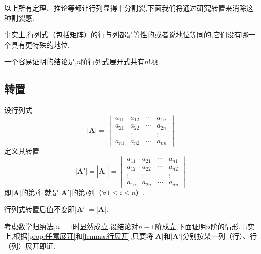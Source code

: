 \begin{red}
    \begin{remark}
        以上所有定理、推论等都让行列显得十分割裂,下面我们将通过研究转置来消除这种割裂感.
    \end{remark}
\end{red}
\begin{red}
    \begin{remark}
        事实上,行列式（包括矩阵）的行与列都是等性的或者说地位等同的,它们没有哪一个具有更特殊的地位.
    \end{remark}
\end{red}
\vfill
\begin{red}
    \begin{remark}
        一个容易证明的结论是,$n$阶行列式展开式共有$n!$项.
    \end{remark}
\end{red}
\subsection{转置}
\begin{formal}
\begin{definition}[转置]\label{def:转置}
    设行列式\[
    \left|\bm{A}\right|=\begin{vmatrix}
        a_{11}&a_{12}&\cdots&a_{1n}\\
        a_{21}&a_{22}&\cdots&a_{2n}\\
        \vdots&\vdots& &\vdots\\
        a_{n1}&a_{n2}&\cdots&a_{nn}
    \end{vmatrix}
    \]定义其转置\[
    \left|\bm{A}'\right|=\left|\bm{A}^{\prime}\right|=\begin{vmatrix}
        a_{11}&a_{21}&\cdots&a_{n1}\\
        a_{12}&a_{22}&\cdots&a_{n2}\\
        \vdots&\vdots& &\vdots\\
        a_{1n}&a_{2n}&\cdots&a_{nn}
    \end{vmatrix}
    \]即$\left|\bm{A}\right|$的第$i$行就是$\left|\bm{A}'\right|$的第$i$列（$\forall 1\leqslant i\leqslant n$）.
\end{definition}
\end{formal}
\begin{formal}
\begin{theorem}[转置不变]\label{thm:转置不变}
    行列式转置后值不变即$\left|\bm{A}'\right|=\left|\bm{A}\right|$.
\end{theorem}
\begin{Proof}
考虑数学归纳法,$n=1$时显然成立.设结论对$n-1$阶成立,下面证明$n$阶的情形.事实上,根据\cref{prop:任意展开}和\cref{lemma:行展开},只要将$\left|\bm{A}\right|$和$\left|\bm{A}'\right|$分别按某一列（行）、行（列）展开即证.
\end{Proof}
\end{formal}
